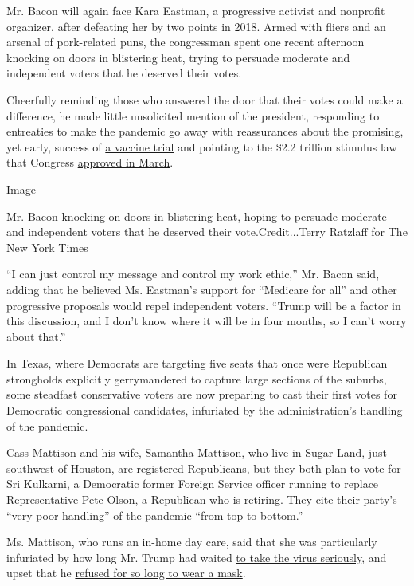Mr. Bacon will again face Kara Eastman, a progressive activist and
nonprofit organizer, after defeating her by two points in 2018. Armed
with fliers and an arsenal of pork-related puns, the congressman spent
one recent afternoon knocking on doors in blistering heat, trying to
persuade moderate and independent voters that he deserved their votes.

Cheerfully reminding those who answered the door that their votes could
make a difference, he made little unsolicited mention of the president,
responding to entreaties to make the pandemic go away with reassurances
about the promising, yet early, success of
\href{https://www.nytimes3xbfgragh.onion/2020/07/14/health/cornavirus-vaccine-moderna.html}{a
vaccine trial} and pointing to the \$2.2 trillion stimulus law that
Congress
\href{https://www.nytimes3xbfgragh.onion/2020/03/27/us/politics/coronavirus-house-voting.html}{approved
in March}.

Image

Mr. Bacon knocking on doors in blistering heat, hoping to persuade
moderate and independent voters that he deserved their
vote.Credit...Terry Ratzlaff for The New York Times

``I can just control my message and control my work ethic,'' Mr. Bacon
said, adding that he believed Ms. Eastman's support for ``Medicare for
all'' and other progressive proposals would repel independent voters.
``Trump will be a factor in this discussion, and I don't know where it
will be in four months, so I can't worry about that.''

In Texas, where Democrats are targeting five seats that once were
Republican strongholds explicitly gerrymandered to capture large
sections of the suburbs, some steadfast conservative voters are now
preparing to cast their first votes for Democratic congressional
candidates, infuriated by the administration's handling of the pandemic.

Cass Mattison and his wife, Samantha Mattison, who live in Sugar Land,
just southwest of Houston, are registered Republicans, but they both
plan to vote for Sri Kulkarni, a Democratic former Foreign Service
officer running to replace Representative Pete Olson, a Republican who
is retiring. They cite their party's ``very poor handling'' of the
pandemic ``from top to bottom.''

Ms. Mattison, who runs an in-home day care, said that she was
particularly infuriated by how long Mr. Trump had waited
\href{https://www.nytimes3xbfgragh.onion/interactive/2020/us/texas-coronavirus-cases.html}{to
take the virus seriously}, and upset that he
\href{https://www.nytimes3xbfgragh.onion/2020/07/01/us/coronavirus-masks.html}{refused
for so long to wear a mask}.

